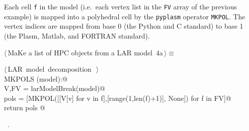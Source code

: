 \documentclass[11pt,oneside]{article}	%
\begin{document}
Each cell \texttt{f} in the model (i.e.~each vertex list in the \texttt{FV} array of the previous example) is mapped into a polyhedral cell by the \texttt{pyplasm} operator \texttt{MKPOL}. The vertex indices are mapped from base 0 (the Python and C standard) to base 1 (the Plasm, Matlab, and FORTRAN standard).
\begin{flushleft} \small
\begin{minipage}{\linewidth} \label{scrap8}
\protect{}$\langle\,$MaKe a list of HPC objects from a LAR model\nobreak\ {\footnotesize 4a}$\,\rangle\equiv$
\vspace{-1ex}
\begin{list}{}{} \item
\mbox{}\verb@@\hbox{$\langle\,$LAR model decomposition\nobreak\ {\footnotesize {}}$\,\rangle$}\verb@@\\
\mbox{}\verb@def MKPOLS (model):@\\
\mbox{}\verb@   V,FV = larModelBreak(model)@\\
\mbox{}\verb@   pols = [MKPOL([[V[v] for v in f],[range(1,len(f)+1)], None]) for f in FV]@\\
\mbox{}\verb@   return pols  @\\
\mbox{}\verb@@{\NWsep}
\end{list}
\vspace{-1ex}
\footnotesize\addtolength{\baselineskip}{-1ex}
\begin{list}{}{\setlength{\itemsep}{-\parsep}\setlength{\itemindent}{-\leftmargin}}
\item \NWtxtMacroRefIn\ .
\end{list}
\end{minipage}\\[4ex]
\end{flushleft}
\end{document}
